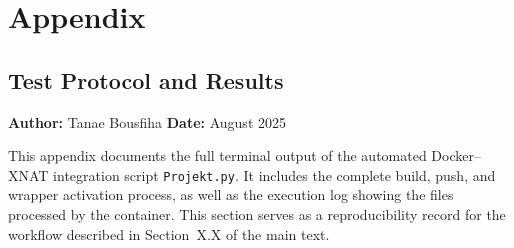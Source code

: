 
    
\appendix
\chapter{Appendix}
\section{Test Protocol and Results}
\label{app:test}

\noindent\textbf{Author:} Tanae Bousfiha  
\noindent\textbf{Date:} August 2025  

\noindent This appendix documents the full terminal output of the automated Docker–XNAT integration script
\texttt{Projekt.py}.  
It includes the complete build, push, and wrapper activation process, as well as the execution log showing the files processed by the container.  
This section serves as a reproducibility record for the workflow described in Section~X.X of the main text.


